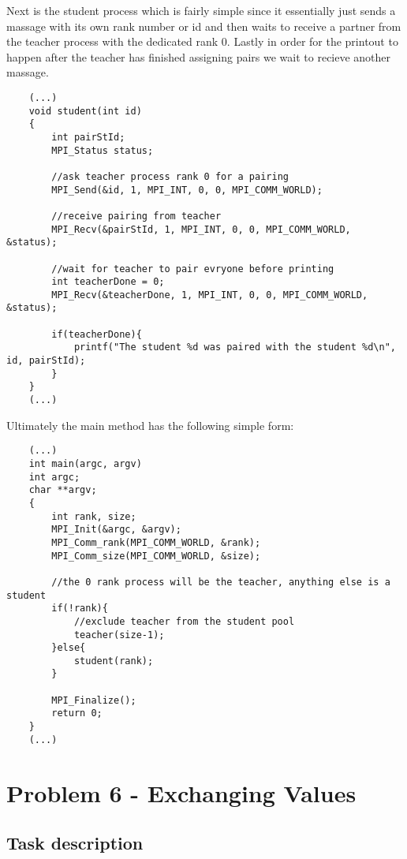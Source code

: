 \documentclass[a4paper,11pt]{article}
\begin{document}
Next is the student process which is fairly simple since it essentially just sends a massage with its own rank number or id and then waits to receive a partner from the teacher process with the dedicated rank 0. Lastly in order for the printout to happen after the teacher has finished assigning pairs we wait to recieve another massage.

\begin{verbatim}
    (...)
    void student(int id)
    {
        int pairStId;
        MPI_Status status;
    
        //ask teacher process rank 0 for a pairing
        MPI_Send(&id, 1, MPI_INT, 0, 0, MPI_COMM_WORLD);
    
        //receive pairing from teacher
        MPI_Recv(&pairStId, 1, MPI_INT, 0, 0, MPI_COMM_WORLD, &status);
    
        //wait for teacher to pair evryone before printing
        int teacherDone = 0;
        MPI_Recv(&teacherDone, 1, MPI_INT, 0, 0, MPI_COMM_WORLD, &status);
    
        if(teacherDone){
            printf("The student %d was paired with the student %d\n", id, pairStId);
        }
    }
    (...)
\end{verbatim}

Ultimately the main method has the following simple form:

\begin{verbatim}
    (...)
    int main(argc, argv)
    int argc;
    char **argv;
    {
        int rank, size;
        MPI_Init(&argc, &argv);
        MPI_Comm_rank(MPI_COMM_WORLD, &rank);
        MPI_Comm_size(MPI_COMM_WORLD, &size);
        
        //the 0 rank process will be the teacher, anything else is a student
        if(!rank){
            //exclude teacher from the student pool
            teacher(size-1);
        }else{
            student(rank);
        }
    
        MPI_Finalize();
        return 0;
    }
    (...)
\end{verbatim}

\section*{Problem 6 - Exchanging Values}

\subsection*{Task description}
\end{document}
